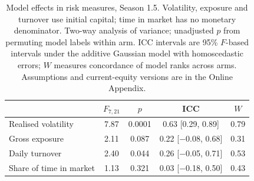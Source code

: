 \begin{table}[ht]
\centering
\small
\caption{Model effects in risk measures, Season 1.5. Volatility, exposure and turnover use initial capital; time in market has no monetary denominator. Two-way analysis of variance; unadjusted $p$ from permuting model labels within arm. ICC intervals are 95\% $F$-based intervals under the additive Gaussian model with homoscedastic errors; $W$ measures concordance of model ranks across arms. Assumptions and current-equity versions are in the Online Appendix.}
\label{tab:trait}
\begin{tabular}{lcccc}
\toprule
 & $F_{7,21}$ & $p$ & ICC & $W$ \\
\midrule
Realised volatility & 7.87 & 0.0001 & 0.63 [0.29, 0.89] & 0.79 \\
Gross exposure & 2.11 & 0.087 & 0.22 [$-$0.08, 0.68] & 0.31 \\
Daily turnover & 2.40 & 0.044 & 0.26 [$-$0.05, 0.71] & 0.53 \\
Share of time in market & 1.13 & 0.321 & 0.03 [$-$0.18, 0.50] & 0.43 \\
\bottomrule
\end{tabular}
\end{table}
